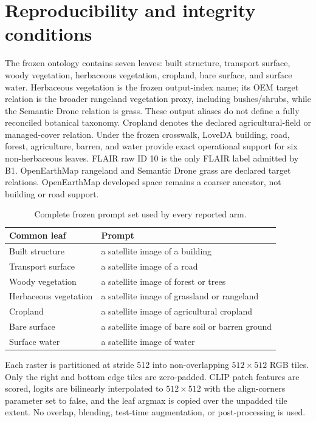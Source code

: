 \section{Reproducibility and integrity conditions}
\label{app:integrity}

The frozen ontology contains seven leaves: built structure, transport surface, woody vegetation, herbaceous vegetation, cropland, bare surface, and surface water. Herbaceous vegetation is the frozen output-index name; its OEM target relation is the broader rangeland vegetation proxy, including bushes/shrubs, while the Semantic Drone relation is grass. These output aliases do not define a fully reconciled botanical taxonomy. Cropland denotes the declared agricultural-field or managed-cover relation. Under the frozen crosswalk, LoveDA building, road, forest, agriculture, barren, and water provide exact operational support for six non-herbaceous leaves. FLAIR raw ID 10 is the only FLAIR label admitted by B1. OpenEarthMap rangeland and Semantic Drone grass are declared target relations. OpenEarthMap developed space remains a coarser ancestor, not building or road support.

\begin{table}[h]
\centering
\caption{Complete frozen prompt set used by every reported arm.}
\label{tab:prompts}
\begin{tabular}{ll}
\toprule
Common leaf & Prompt \\
\midrule
Built structure & a satellite image of a building \\
Transport surface & a satellite image of a road \\
Woody vegetation & a satellite image of forest or trees \\
Herbaceous vegetation & a satellite image of grassland or rangeland \\
Cropland & a satellite image of agricultural cropland \\
Bare surface & a satellite image of bare soil or barren ground \\
Surface water & a satellite image of water \\
\bottomrule
\end{tabular}
\end{table}

Each raster is partitioned at stride 512 into non-overlapping \(512\times512\) RGB tiles. Only the right and bottom edge tiles are zero-padded. CLIP patch features are scored, logits are bilinearly interpolated to \(512\times512\) with the align-corners parameter set to false, and the leaf argmax is copied over the unpadded tile extent. No overlap, blending, test-time augmentation, or post-processing is used.

